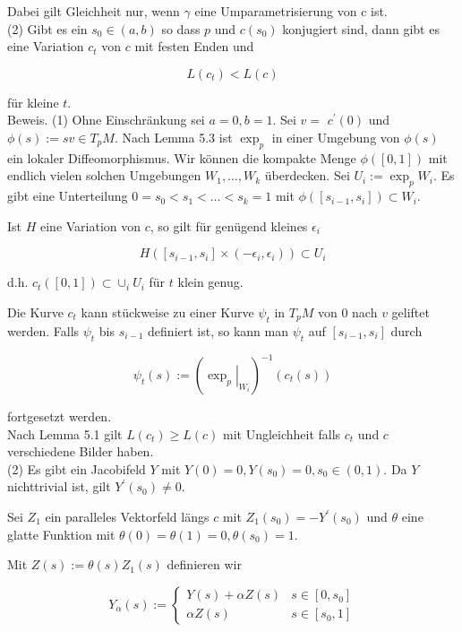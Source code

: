 \documentclass[10pt, letterpaper]{article}
\begin{document}
Dabei gilt Gleichheit nur, wenn $\gamma$ eine Umparametrisierung von c ist.\\
(2) Gibt es ein $s_{0} \in(a, b)$ so dass $p$ und $c\left(s_{0}\right)$ konjugiert sind, dann gibt es eine Variation $c_{t}$ von $c$ mit festen Enden und

$$
L\left(c_{t}\right)<L(c)
$$

für kleine $t$.\\
Beweis. (1) Ohne Einschränkung sei $a=0, b=1$. Sei $v=$ $c^{\prime}(0)$ und $\phi(s):=s v \in T_{p} M$. Nach Lemma 5.3 ist $\exp _{p}$ in einer Umgebung von $\phi(s)$ ein lokaler Diffeomorphismus. Wir können die kompakte Menge $\phi([0,1])$ mit endlich vielen solchen Umgebungen $W_{1}, \ldots, W_{k}$ überdecken. Sei $U_{i}:=\exp _{p} W_{i}$. Es gibt eine Unterteilung $0=s_{0}<s_{1}<\ldots<s_{k}=1$ mit $\phi\left(\left[s_{i-1}, s_{i}\right]\right) \subset W_{i}$.

Ist $H$ eine Variation von $c$, so gilt für genügend kleines $\epsilon_{i}$

$$
H\left(\left[s_{i-1}, s_{i}\right] \times\left(-\epsilon_{i}, \epsilon_{i}\right)\right) \subset U_{i}
$$

d.h. $c_{t}([0,1]) \subset \cup_{i} U_{i}$ für $t$ klein genug.

Die Kurve $c_{t}$ kann stückweise zu einer Kurve $\psi_{t}$ in $T_{p} M$ von 0 nach $v$ geliftet werden. Falls $\psi_{t}$ bis $s_{i-1}$ definiert ist, so kann man $\psi_{t}$ auf $\left[s_{i-1}, s_{i}\right]$ durch

$$
\psi_{t}(s):=\left(\left.\exp _{p}\right|_{W_{i}}\right)^{-1}\left(c_{t}(s)\right)
$$

fortgesetzt werden.\\
Nach Lemma 5.1 gilt $L\left(c_{t}\right) \geq L(c)$ mit Ungleichheit falls $c_{t}$ und $c$ verschiedene Bilder haben.\\
(2) Es gibt ein Jacobifeld $Y$ mit $Y(0)=0, Y\left(s_{0}\right)=0, s_{0} \in(0,1)$. Da $Y$ nichttrivial ist, gilt $Y^{\prime}\left(s_{0}\right) \neq 0$.

Sei $Z_{1}$ ein paralleles Vektorfeld längs $c$ mit $Z_{1}\left(s_{0}\right)=-Y^{\prime}\left(s_{0}\right)$ und $\theta$ eine glatte Funktion mit $\theta(0)=\theta(1)=0, \theta\left(s_{0}\right)=1$.

Mit $Z(s):=\theta(s) Z_{1}(s)$ definieren wir

$$
Y_{\alpha}(s):=\left\{\begin{array}{cl}
Y(s)+\alpha Z(s) & s \in\left[0, s_{0}\right] \\
\alpha Z(s) & s \in\left[s_{0}, 1\right]
\end{array}\right.
$$
\end{document}
